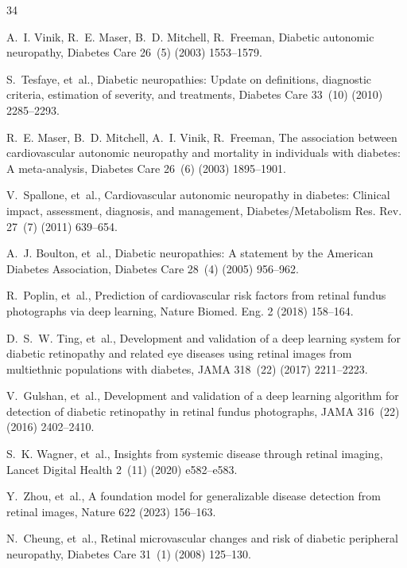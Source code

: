 \documentclass[a4paper,fleqn]{cas-dc}
\begin{document}
\begin{thebibliography}{34}

A.~I. Vinik, R.~E. Maser, B.~D. Mitchell, R.~Freeman, Diabetic autonomic neuropathy, Diabetes Care 26~(5) (2003) 1553--1579.

S.~Tesfaye, et~al., Diabetic neuropathies: Update on definitions, diagnostic criteria, estimation of severity, and treatments, Diabetes Care 33~(10) (2010) 2285--2293.

R.~E. Maser, B.~D. Mitchell, A.~I. Vinik, R.~Freeman, The association between cardiovascular autonomic neuropathy and mortality in individuals with diabetes: A meta-analysis, Diabetes Care 26~(6) (2003) 1895--1901.

V.~Spallone, et~al., Cardiovascular autonomic neuropathy in diabetes: Clinical impact, assessment, diagnosis, and management, Diabetes/Metabolism Res. Rev. 27~(7) (2011) 639--654.

A.~J. Boulton, et~al., Diabetic neuropathies: A statement by the American Diabetes Association, Diabetes Care 28~(4) (2005) 956--962.

R.~Poplin, et~al., Prediction of cardiovascular risk factors from retinal fundus photographs via deep learning, Nature Biomed. Eng. 2 (2018) 158--164.

D.~S.~W. Ting, et~al., Development and validation of a deep learning system for diabetic retinopathy and related eye diseases using retinal images from multiethnic populations with diabetes, JAMA 318~(22) (2017) 2211--2223.

V.~Gulshan, et~al., Development and validation of a deep learning algorithm for detection of diabetic retinopathy in retinal fundus photographs, JAMA 316~(22) (2016) 2402--2410.

S.~K. Wagner, et~al., Insights from systemic disease through retinal imaging, Lancet Digital Health 2~(11) (2020) e582--e583.

Y.~Zhou, et~al., A foundation model for generalizable disease detection from retinal images, Nature 622 (2023) 156--163.

N.~Cheung, et~al., Retinal microvascular changes and risk of diabetic peripheral neuropathy, Diabetes Care 31~(1) (2008) 125--130.


\end{thebibliography}
\end{document}
